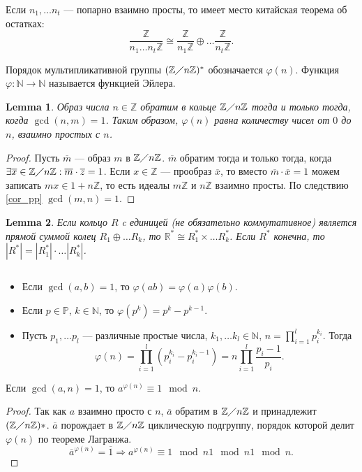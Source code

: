 \documentclass[11pt]{book}
\newcommand{\Z}{\mathbb{Z}}
\newcommand{\N}{\mathbb{N}}
\newcommand{\R}{\mathbb{R}}
\newcommand{\Pm}{\mathbb{P}}
\newcommand{\po}{\diagup}
\theoremstyle{definition}
\theoremstyle{plain}
\theoremstyle{plain}
\newtheorem{lm}{Lemma}
\theoremstyle{definition}
\theoremstyle{remark}
\begin{document}
Если $ n_1, \ldots n_t$ --- попарно взаимно просты, то имеет место китайская теорема об остатках:
\[
    \frac{\Z}{n_1 \ldots n_t\Z} \cong \frac{\Z}{n_1\Z} \oplus \ldots \frac{\Z}{n_t\Z}
.\]
\begin{defn}
    Порядок мультипликативной группы $ (\Z \po n\Z)^{*}$ обозначается $ \varphi (n)$. Функция $ \varphi :\N \to  \N$ называется {\sf функцией Эйлера}.
\end{defn}
\begin{lm}
    Образ числа $ n \in \Z$ обратим в кольце $ \Z \po n\Z$  тогда и только тогда, когда $ \gcd (n,m) = 1$. Таким образом,  $ \varphi (n)$ равна количеству чисел от $ 0$ до $ n$, взаимно простых с  $ n$.
\end{lm}
\begin{proof}
    Пусть $ \overline{m}$ --- образ $ m$ в  $ \Z\po n\Z$.
    $ \overline{m}$ обратим тогда и только тогда, когда $ \exists \overline{x } \in \Z\po n\Z: \overline{m}\cdot \overline{z} = 1$.
    Если $ x \in \Z$ --- прообраз $ \overline{x}$, то вместо $ \overline{m} \cdot  \overline{x} = 1$ можем записать $ mx \in  1 + n\Z$, то есть идеалы $ m\Z$ и  $ n\Z$ взаимно просты. По следствию \ref{cor_pp} $ \gcd(m, n) = 1$.
\end{proof}
\begin{lm}
    Если кольцо $ R$ c единицей (не обязательно коммутативное) является прямой суммой колец  $ R_1 \oplus \ldots R_k$, то $ \R^{*} \cong R_1^{*} \times \ldots R_k^{*}$. Если $ R^{*}$ конечна, то $ |R^{*}| = |R^{*}_1| \cdot \ldots |R_k^{*}|$.
\end{lm}
\begin{thm}
    $ $
    \begin{itemize}[noitemsep]
	\item
	    Если $ \gcd(a, b) = 1$, то  $ \varphi (ab) = \varphi (a) \varphi (b)$.
	\item Если $ p \in \Pm$, $ k \in \N$, то $ \varphi (p^{k}) = p^{k} - p^{k-1}$.
	\item Пусть  $ p_1, \ldots p_l$ --- различные простые числа, $ k_1, \ldots k_l \in \N$, $ n = \prod_{i = 1}^{l}p_i^{k_i}$. Тогда
	    \[
		\varphi (n) = \prod_{i=1}^{l}\left(p_{i}^{k_i} - p_i^{k_i -1}\right) =n\prod_{i = 1}^{l}\frac{p_i - 1}{p_i}
	    .\]
    \end{itemize}
\end{thm}
\begin{thm}
    Если $ \gcd(a, n) = 1$, то  $ a^{ \varphi (n)} \equiv 1 \mod n$.
\end{thm}
\begin{proof}
    Так как $ a$ взаимно просто с  $ n$,  $ \overline{a} $ обратим в $ \Z\po n\Z$ и принадлежит  $ (\Z \po n\Z)*$.  $ \overline{a}$ порождает в $ \Z \po n\Z $ циклическую подгруппу, порядок которой делит  $ \varphi (n)$ по теореме Лагранжа.
    \[
	\overline{a}^{ \varphi (n)} = \overline{1} \Longrightarrow a^{ \varphi (n)} \equiv 1 \mod n1 \mod n1 \mod n
    .\]
\end{proof}
\end{document}
